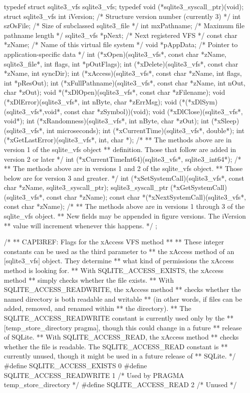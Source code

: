 \begin{Codex}[label=sqlite3.h,numbers=left]
{typedef struct sqlite3_vfs sqlite3_vfs;
typedef void (*sqlite3_syscall_ptr)(void);
struct sqlite3_vfs {
  int iVersion;            /* Structure version number (currently 3) */
  int szOsFile;            /* Size of subclassed sqlite3_file */
  int mxPathname;          /* Maximum file pathname length */
  sqlite3_vfs *pNext;      /* Next registered VFS */
  const char *zName;       /* Name of this virtual file system */
  void *pAppData;          /* Pointer to application-specific data */
  int (*xOpen)(sqlite3_vfs*, const char *zName, sqlite3_file*,
               int flags, int *pOutFlags);
  int (*xDelete)(sqlite3_vfs*, const char *zName, int syncDir);
  int (*xAccess)(sqlite3_vfs*, const char *zName, int flags, int *pResOut);
  int (*xFullPathname)(sqlite3_vfs*, const char *zName, int nOut, char *zOut);
  void *(*xDlOpen)(sqlite3_vfs*, const char *zFilename);
  void (*xDlError)(sqlite3_vfs*, int nByte, char *zErrMsg);
  void (*(*xDlSym)(sqlite3_vfs*,void*, const char *zSymbol))(void);
  void (*xDlClose)(sqlite3_vfs*, void*);
  int (*xRandomness)(sqlite3_vfs*, int nByte, char *zOut);
  int (*xSleep)(sqlite3_vfs*, int microseconds);
  int (*xCurrentTime)(sqlite3_vfs*, double*);
  int (*xGetLastError)(sqlite3_vfs*, int, char *);
  /*
  ** The methods above are in version 1 of the sqlite_vfs object
  ** definition.  Those that follow are added in version 2 or later
  */
  int (*xCurrentTimeInt64)(sqlite3_vfs*, sqlite3_int64*);
  /*
  ** The methods above are in versions 1 and 2 of the sqlite_vfs object.
  ** Those below are for version 3 and greater.
  */
  int (*xSetSystemCall)(sqlite3_vfs*, const char *zName, sqlite3_syscall_ptr);
  sqlite3_syscall_ptr (*xGetSystemCall)(sqlite3_vfs*, const char *zName);
  const char *(*xNextSystemCall)(sqlite3_vfs*, const char *zName);
  /*
  ** The methods above are in versions 1 through 3 of the sqlite_vfs object.
  ** New fields may be appended in figure versions.  The iVersion
  ** value will increment whenever this happens. 
  */
};

/*
** CAPI3REF: Flags for the xAccess VFS method
**
** These integer constants can be used as the third parameter to
** the xAccess method of an [sqlite3_vfs] object.  They determine
** what kind of permissions the xAccess method is looking for.
** With SQLITE_ACCESS_EXISTS, the xAccess method
** simply checks whether the file exists.
** With SQLITE_ACCESS_READWRITE, the xAccess method
** checks whether the named directory is both readable and writable
** (in other words, if files can be added, removed, and renamed within
** the directory).
** The SQLITE_ACCESS_READWRITE constant is currently used only by the
** [temp_store_directory pragma], though this could change in a future
** release of SQLite.
** With SQLITE_ACCESS_READ, the xAccess method
** checks whether the file is readable.  The SQLITE_ACCESS_READ constant is
** currently unused, though it might be used in a future release of
** SQLite.
*/
#define SQLITE_ACCESS_EXISTS    0
#define SQLITE_ACCESS_READWRITE 1   /* Used by PRAGMA temp_store_directory */
#define SQLITE_ACCESS_READ      2   /* Unused */

}
\end{Codex}
